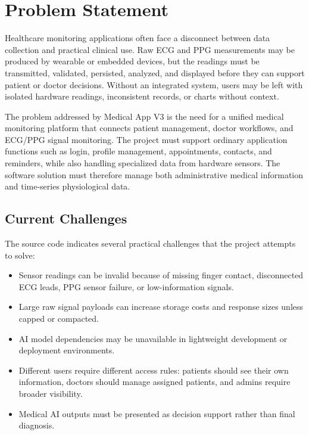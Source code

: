 \chapter{Problem Statement}

Healthcare monitoring applications often face a disconnect between data collection and practical clinical use. Raw ECG and PPG measurements may be produced by wearable or embedded devices, but the readings must be transmitted, validated, persisted, analyzed, and displayed before they can support patient or doctor decisions. Without an integrated system, users may be left with isolated hardware readings, inconsistent records, or charts without context.

The problem addressed by Medical App V3 is the need for a unified medical monitoring platform that connects patient management, doctor workflows, and ECG/PPG signal monitoring. The project must support ordinary application functions such as login, profile management, appointments, contacts, and reminders, while also handling specialized data from hardware sensors. The software solution must therefore manage both administrative medical information and time-series physiological data.

\section{Current Challenges}

The source code indicates several practical challenges that the project attempts to solve:

\begin{itemize}[leftmargin=*]
    \item Sensor readings can be invalid because of missing finger contact, disconnected ECG leads, PPG sensor failure, or low-information signals.
    \item Large raw signal payloads can increase storage costs and response sizes unless capped or compacted.
    \item AI model dependencies may be unavailable in lightweight development or deployment environments.
    \item Different users require different access rules: patients should see their own information, doctors should manage assigned patients, and admins require broader visibility.
    \item Medical AI outputs must be presented as decision support rather than final diagnosis.
\end{itemize}

